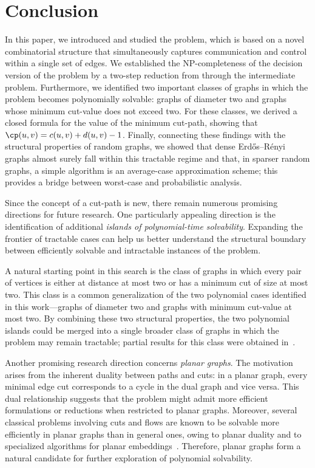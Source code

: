 \section{Conclusion}
\label{sec:conclusion}

In this paper, we introduced and studied the \MinCutPath{} problem, which is based on a novel combinatorial structure that simultaneously captures communication and control within a single set of edges.
We established the NP-completeness of the decision version of the problem by a two-step reduction from \ThreeSAT{} through the intermediate \SSP{} problem.
Furthermore, we identified two important classes of graphs in which the problem becomes polynomially solvable: graphs of diameter two and graphs whose minimum cut-value does not exceed two.
For these classes, we derived a closed formula for the value of the minimum cut-path, showing that $\cp(u, v) = c(u, v) + d(u, v) - 1$.
Finally, connecting these findings with the structural properties of random graphs, we showed that dense Erdős–Rényi graphs almost surely fall within this tractable regime and that, in sparser random graphs, a simple algorithm is an average-case approximation scheme; this provides a bridge between worst-case and probabilistic analysis.

Since the concept of a cut-path is new, there remain numerous promising directions for future research.
One particularly appealing direction is the identification of additional \emph{islands of polynomial-time solvability}.
Expanding the frontier of tractable cases can help us better understand the structural boundary between efficiently solvable and intractable instances of the \MinCutPath{} problem.

A natural starting point in this search is the class of graphs in which every pair of vertices is either at distance at most two or has a minimum cut of size at most two.
This class is a common generalization of the two polynomial cases identified in this work---graphs of diameter two and graphs with minimum cut-value at most two.
By combining these two structural properties, the two polynomial islands could be merged into a single broader class of graphs in which the \MinCutPath{} problem may remain tractable; partial results for this class were obtained in~\cite{Michel2025MinCutPath}.


Another promising research direction concerns \emph{planar graphs}.
The motivation arises from the inherent duality between paths and cuts: in a planar graph, every minimal edge cut corresponds to a cycle in the dual graph and vice versa.
This dual relationship suggests that the \MinCutPath{} problem might admit more efficient formulations or reductions when restricted to planar graphs.
Moreover, several classical problems involving cuts and flows are known to be solvable more efficiently in planar graphs than in general ones, owing to planar duality and to specialized algorithms for planar embeddings~\cite{itai1979maximum,henzinger1997faster}.
Therefore, planar graphs form a natural candidate for further exploration of polynomial solvability.

